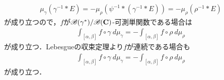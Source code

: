 \begin{sketch}
		\begin{align}
			\mu_{\gamma}\left(\gamma^{-1} \ast E\right) = -\mu_{\rho}\left(\psi^{-1} \ast (\gamma^{-1} \ast E)\right)
			= -\mu_{\rho}\left(\rho^{-1} \ast E\right)
		\end{align}
		が成り立つので，$f$が$\mathscr{B}(\gamma^*)/\mathscr{B}(\mathbf{C})$-可測単関数である場合は
		\begin{align}
			\int_{[\alpha,\beta]} f \circ \gamma\ d\mu_{\gamma} = -\int_{[\alpha,\beta]} f \circ \rho\ d\mu_{\rho}
		\end{align}
		が成り立つ．Lebesgueの収束定理より$f$が連続である場合も
		\begin{align}
			\int_{[\alpha,\beta]} f \circ \gamma\ d\mu_{\gamma} = -\int_{[\alpha,\beta]} f \circ \rho\ d\mu_{\rho}
		\end{align}
		が成り立つ．
		\QED
	\end{sketch}